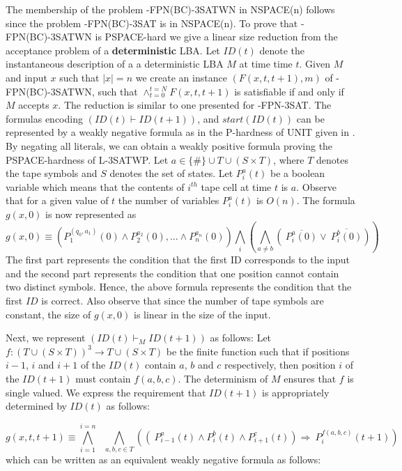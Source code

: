The membership of the problem {-FPN(BC)-3SATWN} in {\sf NSPACE(n)} 
follows since the problem {-FPN(BC)-3SAT} is in {\sf NSPACE(n)}.  
To prove that {-FPN(BC)-3SATWN} is {\sf PSPACE}-hard we give a linear size
reduction from the acceptance problem of a {\bf deterministic} {\sf LBA}.
Let $ID(t)$ denote the  instantaneous description of a
a deterministic {\sf LBA} $M$ at time time $t$.
Given $M$ and input $x$ such that $|x| = n$ we create
an instance $(F(x,t,t+1),m)$ of {-FPN(BC)-3SATWN}, such that 
$\wedge_{t = 0}^{t = N} F(x, t, t+1)$ is 
satisfiable if and only if $M$ accepts $x$. 
The reduction is similar to one presented for  {-FPN-3SAT}. 
The formulas encoding $(ID(t) \vdash ID(t+1))$, and $start(ID(t))$
can  be represented by a weakly negative formula
as in the {\sf P}-hardness of {\sf UNIT} given in \cite{JL77}. 
By negating all literals, we can 
obtain a weakly positive formula proving the {\sf PSPACE}-hardness of 
{\sf L-3SATWP}. Let $a \in \{ \# \} \cup T \cup  (S \times T)$, where 
$T$ denotes the tape symbols and $S$ denotes the set of states. 
Let $P^a_i(t)$ be a boolean variable which means that the contents
of $i^{th}$ tape cell at time $t$ is $a$. Observe that for a given value of $t$
the number of variables $P^a_i(t)$ is $O(n)$. 
The formula $g(x,0)$ is now represented as
\[g(x, 0) \equiv 
\left( P_{1}^{(q_0,a_1)}(0) \wedge P_{2}^{a_2}(0),\ldots \wedge 
P_{n}^{a_n}(0) \right) \bigwedge_{i} \left(\bigwedge_{a \neq b} 
(~\overline{P_{i}^a(0)} \vee  ~\overline{P_{i}^b(0)}) \right)\]
The first part represents the condition that the first ID corresponds to the
input and the second part represents the condition that one position
cannot contain two distinct symbols. Hence, the above formula represents the
condition that the first $ID$ is correct.  Also observe that since the number 
of tape symbols are constant, the size of $g(x,0)$ is linear in the size of 
the input.

Next, we represent  $(ID(t) {\vdash}_M ID(t+1))$
as follows:
Let $f:(T \cup (S \times T))^3 \rightarrow T \cup (S \times T)$ be the finite
function such that if positions $i-1$, $i$ and $i+1$ of the $ID(t)$ 
contain $a$, $b$ and $c$ respectively, then position $i$ of the $ID(t+1)$ 
must contain $f(a,b,c)$. The determinism of $M$ ensures that
$f$ is single valued. We express the requirement that $ID(t+1)$ 
is appropriately  determined by $ID(t)$ as follows:


\[g(x, t,t+1) \equiv  \bigwedge_{i =1}^{ i = n} ~~~ \bigwedge_{a,b,c \in T} 
\left(\left(~P_{i-1}^{a}(t) \wedge P_{i}^{b}(t) \wedge 
P_{i+1}^{c}(t) \right) \Rightarrow ~P_{i}^{f(a,b,c)}(t+1) \right) \]
which can be written as an equivalent weakly negative formula as follows:

